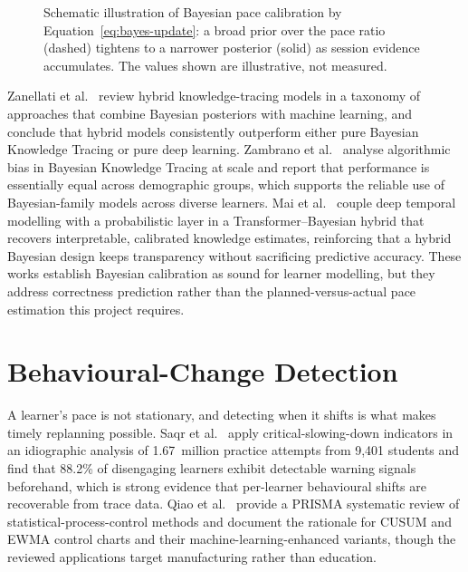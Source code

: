 \begin{figure}[htbp]
\centering
{}
\caption{Schematic illustration of Bayesian pace calibration by Equation~\eqref{eq:bayes-update}: a broad prior over the pace ratio (dashed) tightens to a narrower posterior (solid) as session evidence accumulates. The values shown are illustrative, not measured.}
\label{fig:bayes-update}
\end{figure}

Zanellati et al.~\cite{zanellati2024} review hybrid knowledge-tracing models in a taxonomy of approaches that combine Bayesian posteriors with machine learning, and conclude that hybrid models consistently outperform either pure Bayesian Knowledge Tracing or pure deep learning. Zambrano et al.~\cite{zambrano2024} analyse algorithmic bias in Bayesian Knowledge Tracing at scale and report that performance is essentially equal across demographic groups, which supports the reliable use of Bayesian-family models across diverse learners. Mai et al.~\cite{mai2025} couple deep temporal modelling with a probabilistic layer in a Transformer--Bayesian hybrid that recovers interpretable, calibrated knowledge estimates, reinforcing that a hybrid Bayesian design keeps transparency without sacrificing predictive accuracy. These works establish Bayesian calibration as sound for learner modelling, but they address correctness prediction rather than the planned-versus-actual pace estimation this project requires.

\section{Behavioural-Change Detection}
A learner's pace is not stationary, and detecting when it shifts is what makes timely replanning possible. Saqr et al.~\cite{saqr2026} apply critical-slowing-down indicators in an idiographic analysis of 1.67~million practice attempts from 9{,}401 students and find that 88.2\% of disengaging learners exhibit detectable warning signals beforehand, which is strong evidence that per-learner behavioural shifts are recoverable from trace data. Qiao et al.~\cite{qiao2026} provide a PRISMA systematic review of statistical-process-control methods and document the rationale for CUSUM and EWMA control charts and their machine-learning-enhanced variants, though the reviewed applications target manufacturing rather than education.

